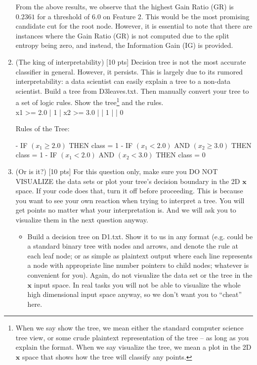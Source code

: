 \documentclass[a4paper]{article}
\theoremstyle{definition}
\def\x{\mathbf x}
\begin{document}
\begin{enumerate}
From the above results, we observe that the highest Gain Ratio (GR) is \(0.2361\) for a threshold of \(6.0\) on Feature 2. This would be the most promising candidate cut for the root node. However, it is essential to note that there are instances where the Gain Ratio (GR) is not computed due to the split entropy being zero, and instead, the Information Gain (IG) is provided.

\item (The king of interpretability)  [10 pts] Decision tree is not the most accurate classifier in general.  However, it persists.  This is largely due to its rumored interpretability: a data scientist can easily explain a tree to a non-data scientist.  Build a tree from D3leaves.txt.  Then manually convert your tree to a set of logic rules.  Show the tree\footnote{When we say show the tree, we mean either the standard computer science tree view, or some crude plaintext representation of the tree -- as long as you explain the format.  When we say visualize the tree, we mean a plot in the 2D $\x$ space that shows how the tree will classify any points.} and the rules. \\

x1 >= 2.0
|   1
|   x2 >= 3.0
|   |   1
|   |   0

Rules of the Tree:

- IF $(x_1 \geq 2.0)$ THEN class = 1
- IF $(x_1 < 2.0)$ AND $(x_2 \geq 3.0)$ THEN class = 1
- IF $(x_1 < 2.0)$ AND $(x_2 < 3.0)$ THEN class = 0

\item (Or is it?)  [10 pts] For this question only, make sure you DO NOT VISUALIZE the data sets or plot your tree's decision boundary in the 2D $\x$ space.  If your code does that, turn it off before proceeding.  This is because you want to see your own reaction when trying to interpret a tree.  You will get points no matter what your interpretation is.
And we will ask you to visualize them in the next question anyway.
  \begin{itemize}
  
  \item Build a decision tree on D1.txt.  Show it to us in any format (e.g. could be a standard binary tree with nodes and arrows, and denote the rule at each leaf node; or as simple as plaintext output where each line represents a node with appropriate line number pointers to child nodes; whatever is convenient for you). Again, do not visualize the data set or the tree in the $\x$ input space.  In real tasks you will not be able to visualize the whole high dimensional input space anyway, so we don't want you to ``cheat'' here. 
  

\end{itemize}
\end{enumerate}
\end{document}
